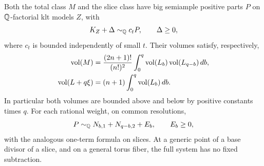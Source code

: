 \begin{lemma}\label{jet:bundle-models}
Both the total class \(M\) and the slice class have big semiample
positive parts \(P\) on \(\mathbb{Q}\)-factorial klt models \(Z\), with
\[
 K_Z+\Delta\sim_{\mathbb{Q}}c_tP,\qquad \Delta\ge0,
\]
where \(c_t\) is bounded independently of small \(t\).
Their volumes satisfy, respectively,
\begin{align}
 \operatorname{vol}(M)&=\frac{(2n+1)!}{(n!)^2}
   \int_0^q\operatorname{vol}(L_b)\operatorname{vol}(L_{q-b})\,db,\label{jet:total-volume}\\
 \operatorname{vol}(L+q\xi)&=(n+1)\int_0^q\operatorname{vol}(L_b)\,db.\label{jet:slice-volume}
\end{align}
In particular both volumes are bounded above and below by positive
constants times \(q\).  For each rational weight, on common
resolutions,
\begin{equation}\label{jet:weight-domination}
 P\sim_{\mathbb{Q}}N_{b,1}+N_{q-b,2}+E_b,\qquad E_b\ge0,
\end{equation}
with the analogous one-term formula on slices.
At a generic point of a base divisor of a slice, and on a general
torus fiber, the full system has no fixed subtraction.
\end{lemma}

